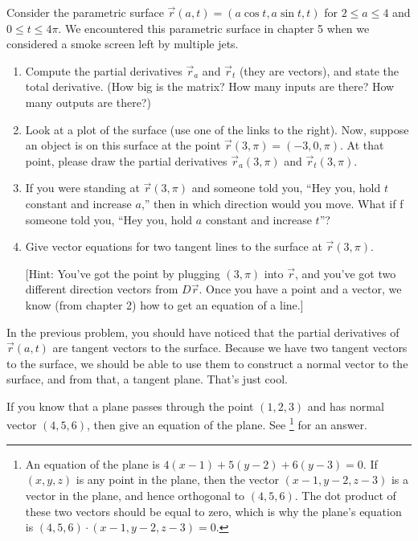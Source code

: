 \begin{problem}
 Consider the parametric surface $\vec r(a,t) = (a\cos t, a\sin t, t)$ for $2\leq a\leq 4$ and $0\leq t\leq 4\pi$. We encountered this parametric surface in chapter 5 when we considered a smoke screen left by multiple jets.
\begin{enumerate}
 \item Compute the partial derivatives $\vec r_a$ and $\vec r_t$ (they are vectors), and state the total derivative. (How big is the matrix? How many inputs are there? How many outputs are there?)
 \item {}%
Look at a plot of the surface (use one of the links to the right). Now, suppose an object is on this surface at the point $\vec r(3,\pi) = (-3,0,\pi)$. At that point, please draw the partial derivatives $\vec r_a(3,\pi)$ and $\vec r_t(3,\pi)$.  
 \item If you were standing at $\vec r(3,\pi)$ and someone told you, ``Hey you, hold $t$ constant and increase $a$,'' then in which direction would you move. What if f someone told you, ``Hey you, hold $a$ constant and increase $t$''?
 \item Give vector equations for two tangent lines to the surface at $\vec r(3,\pi)$. 

[Hint: You've got the point by plugging $(3,\pi)$ into $\vec r$, and you've got two different direction vectors from $D\vec r$. Once you have a point and a vector, we know (from chapter 2) how to get an equation of a line.]
\end{enumerate}
  
\end{problem}

In the previous problem, you should have noticed that the partial derivatives of $\vec r(a,t)$ are tangent vectors to the surface. Because we have two tangent vectors to the surface, we should be able to use them to construct a normal vector to the surface, and from that, a tangent plane. That's just cool.
\begin{review*}
 If you know that a plane passes through the point $(1,2,3)$ and has normal vector $(4,5,6)$, then give an equation of the plane.  See \footnote{An equation of the plane is $4(x-1)+5(y-2)+6(y-3)=0$. If $(x,y,z)$ is any point in the plane, then the vector $(x-1,y-2,z-3)$ is a vector in the plane, and hence orthogonal to $(4,5,6)$. The dot product of these two vectors should be equal to zero, which is why the plane's equation is $(4,5,6)\cdot (x-1,y-2,z-3)=0$.} for an answer.
\end{review*}

